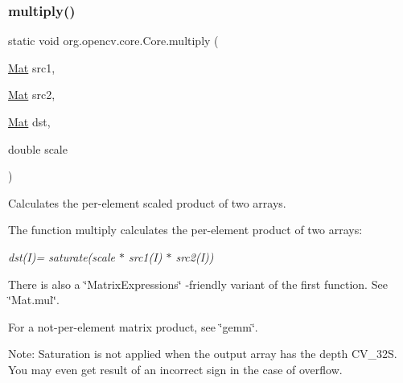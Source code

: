 \subsubsection{\texorpdfstring{multiply()}{multiply()}\hspace{0.1cm}{\footnotesize\ttfamily [2/6]}}
{\footnotesize\ttfamily static void org.\+opencv.\+core.\+Core.\+multiply (\begin{DoxyParamCaption}\item[{\mbox{\hyperlink{classorg_1_1opencv_1_1core_1_1_mat}{Mat}}}]{src1,  }\item[{\mbox{\hyperlink{classorg_1_1opencv_1_1core_1_1_mat}{Mat}}}]{src2,  }\item[{\mbox{\hyperlink{classorg_1_1opencv_1_1core_1_1_mat}{Mat}}}]{dst,  }\item[{double}]{scale }\end{DoxyParamCaption})\hspace{0.3cm}{\ttfamily [static]}}

Calculates the per-\/element scaled product of two arrays.

The function {\ttfamily multiply} calculates the per-\/element product of two arrays\+:

{\itshape dst(\+I)= saturate(scale $\ast$ src1(\+I) $\ast$ src2(\+I))}

There is also a \char`\"{}\+Matrix\+Expressions\char`\"{} -\/friendly variant of the first function. See \char`\"{}\+Mat.\+mul\char`\"{}.

For a not-\/per-\/element matrix product, see \char`\"{}gemm\char`\"{}.

Note\+: Saturation is not applied when the output array has the depth {\ttfamily C\+V\+\_\+32S}. You may even get result of an incorrect sign in the case of overflow.


